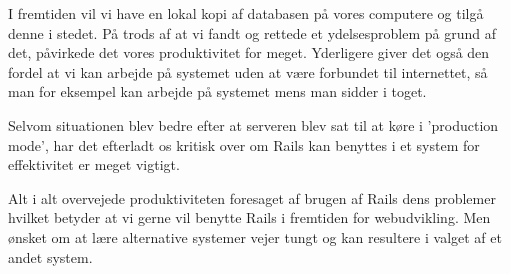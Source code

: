I fremtiden vil vi have en lokal kopi af databasen på vores computere og tilgå denne i stedet. På trods af at vi fandt og rettede et ydelsesproblem på grund af det, påvirkede det vores produktivitet for meget. Yderligere giver det også den fordel at vi kan arbejde på systemet uden at være forbundet til internettet, så man for eksempel kan arbejde på systemet mens man sidder i toget.

Selvom situationen blev bedre efter at serveren blev sat til at køre i 'production mode', har det efterladt os kritisk over om Rails kan benyttes i et system for effektivitet er meget vigtigt.

Alt i alt overvejede produktiviteten foresaget af brugen af Rails dens problemer hvilket betyder at vi gerne vil benytte Rails i fremtiden for webudvikling. Men ønsket om at lære alternative systemer vejer tungt og kan resultere i valget af et andet system.

